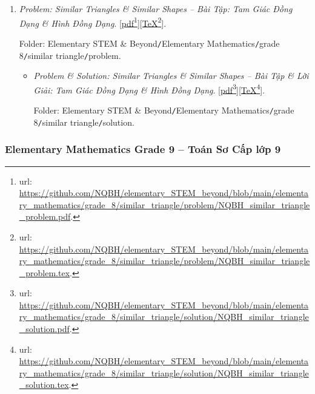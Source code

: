 \documentclass[12pt,twoside]{book}
\begin{document}
\begin{enumerate}
\begin{itemize}
		Folder: {\sf Elementary STEM \& Beyond{\tt/}Elementary Mathematics{\tt/}grade 8{\tt/}1st-order polynomial equation 1 variable{\tt/}solution}.
	\end{itemize}
	\item {\it Problem: Similar Triangles \& Similar Shapes -- Bài Tập: Tam Giác Đồng Dạng \& Hình Đồng Dạng}. [\href{https://github.com/NQBH/elementary_STEM_beyond/blob/main/elementary_mathematics/grade_8/similar_triangle/problem/NQBH_similar_triangle_problem.pdf}{pdf}\footnote{{\sc url}: \url{https://github.com/NQBH/elementary_STEM_beyond/blob/main/elementary_mathematics/grade_8/similar_triangle/problem/NQBH_similar_triangle_problem.pdf}.}][\href{https://github.com/NQBH/elementary_STEM_beyond/blob/main/elementary_mathematics/grade_8/similar_triangle/problem/NQBH_similar_triangle_problem.tex}{\TeX}\footnote{{\sc url}: \url{https://github.com/NQBH/elementary_STEM_beyond/blob/main/elementary_mathematics/grade_8/similar_triangle/problem/NQBH_similar_triangle_problem.tex}.}].
	
	Folder: {\sf Elementary STEM \& Beyond{\tt/}Elementary Mathematics{\tt/}grade 8{\tt/}similar triangle{\tt/}problem}.
	\begin{itemize}
		\item {\it Problem \& Solution: Similar Triangles \& Similar Shapes -- Bài Tập \& Lời Giải: Tam Giác Đồng Dạng \& Hình Đồng Dạng}. [\href{https://github.com/NQBH/elementary_STEM_beyond/blob/main/elementary_mathematics/grade_8/similar_triangle/solution/NQBH_similar_triangle_solution.pdf}{pdf}\footnote{{\sc url}: \url{https://github.com/NQBH/elementary_STEM_beyond/blob/main/elementary_mathematics/grade_8/similar_triangle/solution/NQBH_similar_triangle_solution.pdf}.}][\href{https://github.com/NQBH/elementary_STEM_beyond/blob/main/elementary_mathematics/grade_8/similar_triangle/solution/NQBH_similar_triangle_solution.tex}{\TeX}\footnote{{\sc url}: \url{https://github.com/NQBH/elementary_STEM_beyond/blob/main/elementary_mathematics/grade_8/similar_triangle/solution/NQBH_similar_triangle_solution.tex}.}].
		
		Folder: {\sf Elementary STEM \& Beyond{\tt/}Elementary Mathematics{\tt/}grade 8{\tt/}similar triangle{\tt/}solution}.
	\end{itemize}
\end{enumerate}

\subsubsection{Elementary Mathematics Grade 9 -- Toán Sơ Cấp lớp 9}
\end{document}

